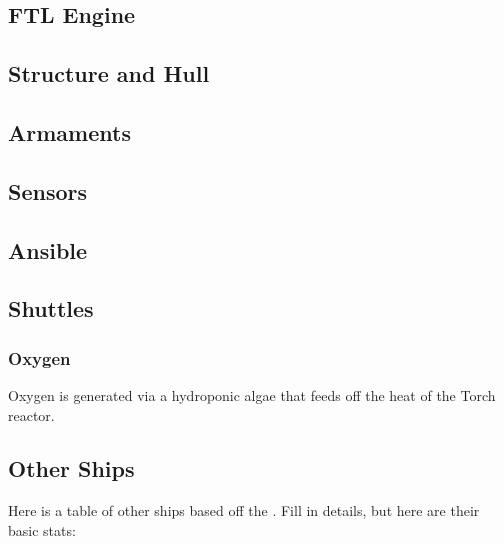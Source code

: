 \subsection{FTL Engine}

\subsection{Structure and Hull}

\subsection{Armaments}

\subsection{Sensors}

\subsection{Ansible}

\subsection{Shuttles}

\subsubsection{Oxygen}
Oxygen is generated via a hydroponic algae that feeds off the heat of the Torch reactor.

\subsection{Other Ships}
Here is a table of other ships based off the \shipname . Fill in details, but here are their basic stats:

